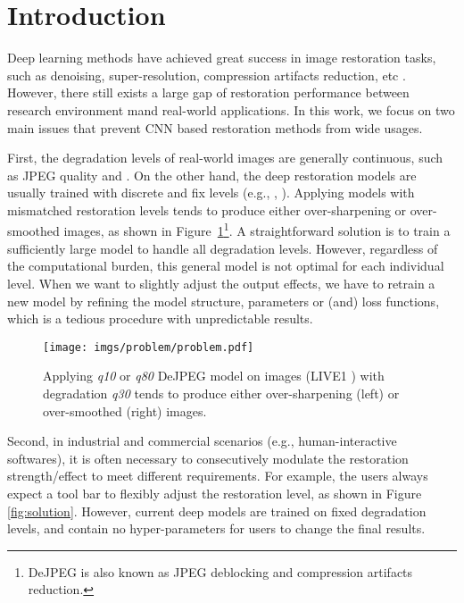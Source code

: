 \documentclass[10pt,twocolumn,letterpaper]{article}
\begin{document}
\section{Introduction}


Deep learning methods have achieved great success in image restoration tasks, such as denoising, super-resolution, compression artifacts reduction, etc \cite{lim2017enhanced, ledig2017photo, dong2014learning, Dong_2015_ICCV, zhang2017beyond}. However, there still exists a large gap of restoration performance between research environment mand real-world applications. In this work, we focus on two main issues that prevent CNN based restoration methods from wide usages. 

First, the degradation levels of real-world images are generally continuous, such as JPEG quality  and . On the other hand, the deep restoration models are usually trained with discrete and fix levels (e.g., , ). Applying models with mismatched restoration levels tends to produce either over-sharpening or over-smoothed images, as shown in Figure~\ref{fig:problem}\footnote{DeJPEG is also known as JPEG deblocking and compression artifacts reduction.}. A straightforward solution is to train a sufficiently large model to handle all degradation levels. However, regardless of the computational burden, this general model is not optimal for each individual level. When we want to slightly adjust the output effects, we have to retrain a new model by refining the model structure, parameters or (and) loss functions, which is a tedious procedure with unpredictable results.

\begin{figure}[]
\vspace{-0.5em}
\centering
\texttt{[image: imgs/problem/problem.pdf]}
\vspace{-0.5em}
\caption{Applying \textit{q10} or \textit{q80} DeJPEG model on images (LIVE1 \cite{1709988}) with degradation \textit{q30} tends to produce either over-sharpening (left) or over-smoothed (right) images.}
\vspace{-2em}
\label{fig:problem}
\end{figure}

Second, in industrial and commercial scenarios (e.g., human-interactive softwares), it is often necessary to consecutively modulate the restoration strength/effect to meet different requirements. For example, the users always expect a tool bar to flexibly adjust the restoration level, as shown in Figure \ref{fig:solution}. However, current deep models are trained on fixed degradation levels, and contain no hyper-parameters for users to change the final results. 
\end{document}
